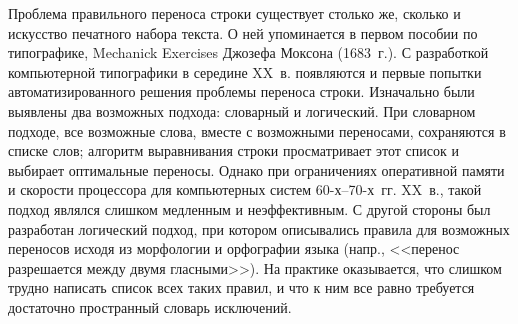 \documentclass[12pt,a4paper,oneside]{extarticle}
\begin{document}
Проблема правильного переноса строки существует столько же, сколько и искусство печатного набора текста. О ней упоминается в первом пособии по типографике, \textenglish{Mechanick Exercises} Джозефа Моксона (1683~г.). С разработкой компьютерной типографики в середине XX~в. появляются и первые попытки автоматизированного решения проблемы переноса строки. Изначально были выявлены два возможных подхода: словарный и логический. При словарном подходе, все возможные слова, вместе с возможными переносами, сохраняются в списке слов; алгоритм выравнивания строки просматривает этот список и выбирает оптимальные переносы. Однако при ограничениях оперативной памяти и скорости процессора для компьютерных систем 60-х--70-х~гг. XX~в., такой подход являлся слишком медленным и неэффективным. С другой стороны был разработан логический подход, при котором описывались правила для возможных переносов исходя из морфологии и орфографии языка (напр., <<перенос разрешается между двумя гласными>>). На практике оказывается, что слишком трудно написать список всех таких правил, и что к ним все равно требуется достаточно пространный словарь исключений.
\end{document}
